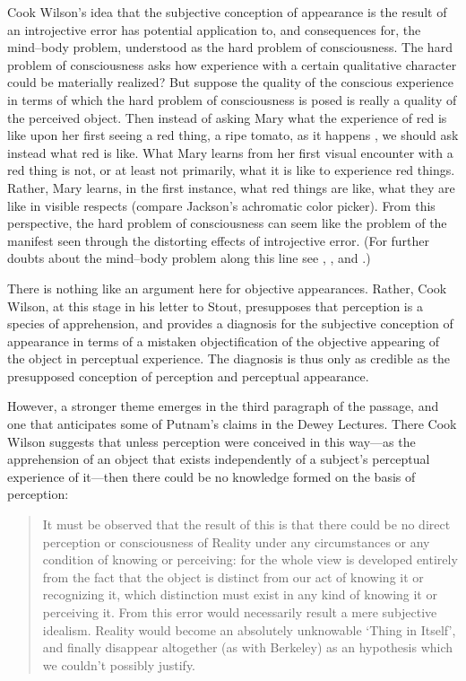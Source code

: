 \documentclass[12pt]{article}
\begin{document}
Cook Wilson's idea that the subjective conception of appearance is the result of an introjective error has potential application to, and consequences for, the mind--body problem, understood as the hard problem of consciousness. The hard problem of consciousness asks how experience with a certain qualitative character could be materially realized? But suppose the quality of the conscious experience in terms of which the hard problem of consciousness is posed is really a quality of the perceived object. Then instead of asking Mary what the experience of red is like upon her first seeing a red thing, a ripe tomato, as it happens \citep{Jackson:1982my}, we should ask instead what red is like. What Mary learns from her first visual encounter with a red thing is not, or at least not primarily, what it is like to experience red things. Rather, Mary learns, in the first instance, what red things are like, what they are like in visible respects (compare Jackson's \citeyear{Jackson:1977fk} achromatic color picker). From this perspective, the hard problem of consciousness can seem like the problem of the manifest seen through the distorting effects of introjective error. (For further doubts about the mind--body problem along this line see \citealt{Shoemaker:2003wk}, \citealt{Byrne:2005jw}, and \citealt{Kalderon:2006tg}.)

There is nothing like an argument here for objective appearances. Rather, Cook Wilson, at this stage in his letter to Stout, presupposes that perception is a species of apprehension, and provides a diagnosis for the subjective conception of appearance in terms of a mistaken objectification of the objective appearing of the object in perceptual experience. The diagnosis is thus only as credible as the presupposed conception of perception and perceptual appearance.

However, a stronger theme emerges in the third paragraph of the passage, and one that anticipates some of Putnam's \citeyearpar{Putnam:1994kx} claims in the Dewey Lectures. There Cook Wilson suggests that unless perception were conceived in this way---as the apprehension of an object that exists independently of a subject's perceptual experience of it---then there could be no knowledge formed on the basis of perception:
\begin{quote}
    It must be observed that the result of this is that there could be no direct perception or consciousness of Reality under any circumstances or any condition of knowing or perceiving: for the whole view is developed entirely from the fact that the object is distinct from our act of knowing it or recognizing it, which distinction must exist in any kind of knowing it or perceiving it. From this error would necessarily result a mere subjective idealism. Reality would become an absolutely unknowable `Thing in Itself', and finally disappear altogether (as with Berkeley) as an hypothesis which we couldn't possibly justify. \citep[\emph{Correspondence with Stout 1904},][797]{Cook-Wilson:1926sf}
\end{quote}
\end{document}
